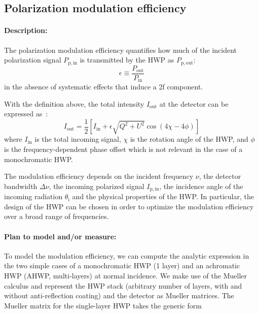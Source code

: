 
\subsection{Polarization modulation efficiency}\label{subsec:modeff}

\paragraph{Description:}
The polarization modulation efficiency quantifies how much of the incident polarization signal $P_\mathrm{p,in}$ is transmitted by the HWP as $P_\mathrm{p,out}$:
\begin{equation}
\epsilon \equiv \frac{P_\mathrm{out}}{P_\mathrm{in}}
\end{equation}
in the absence of systematic effects that induce a 2f component.

With the definition above, the total intensity $I_\mathrm{out}$ at the detector can be expressed as~\cite{Matsumura:2008zx}:
\begin{equation}
I_\mathrm{out}=\frac{1}{2}\left[I_\mathrm{in}+\epsilon\sqrt{Q^2+U^2} \cos(4\chi-4\phi)\right]
\end{equation}
where $I_\mathrm{in}$ is the total incoming signal, $\chi$ is the rotation angle of the HWP, and $\phi$ is the frequency-dependent phase offset which is not relevant in the case of a monochromatic HWP.

The modulation efficiency depends on the incident frequency $\nu$, the detector bandwidth $\Delta \nu$, the incoming polarized signal $I_\mathrm{p,in}$, the incidence angle of the incoming radiation $\theta_\mathrm{i}$ and the physical properties of the HWP. In particular, the design of the HWP can be chosen in order to optimize the modulation efficiency over a broad range of frequencies. 

\paragraph{Plan to model and/or measure:}
To model the modulation efficiency, we can compute the analytic expression in the two simple cases of a monochromatic HWP (1 layer) and an achromatic HWP (AHWP, multi-layers) at normal incidence. We make use of the Mueller calculus and represent the HWP stack (arbitrary number of layers, with and without anti-reflection coating) and the detector as Mueller matrices. The Mueller matrix for the single-layer HWP takes the generic form 

